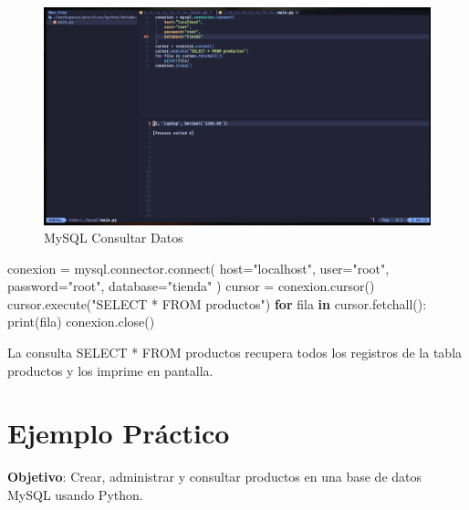 \documentclass[
  a4paper,
  DIV=11,
  numbers=noendperiod,
  onepage,
  openany]{scrreprt}
\newenvironment{Shaded}{\begin{snugshade}}{\end{snugshade}}
\newcommand{\BuiltInTok}[1]{\textcolor[rgb]{0.00,0.23,0.31}{#1}}
\newcommand{\ControlFlowTok}[1]{\textcolor[rgb]{0.00,0.23,0.31}{\textbf{#1}}}
\newcommand{\ExtensionTok}[1]{\textcolor[rgb]{0.00,0.23,0.31}{#1}}
\newcommand{\KeywordTok}[1]{\textcolor[rgb]{0.00,0.23,0.31}{\textbf{#1}}}
\newcommand{\NormalTok}[1]{\textcolor[rgb]{0.00,0.23,0.31}{#1}}
\newcommand{\OperatorTok}[1]{\textcolor[rgb]{0.37,0.37,0.37}{#1}}
\newcommand{\StringTok}[1]{\textcolor[rgb]{0.13,0.47,0.30}{#1}}
\begin{document}
\begin{figure}[H]

{\centering \includegraphics[width=8.33333in,height=\textheight,keepaspectratio]{unidades/unidad6/./images/mysql_code003.png}

}

\caption{MySQL Consultar Datos}

\end{figure}%

\begin{Shaded}
\begin{Highlighting}[]
\NormalTok{conexion }\OperatorTok{=}\NormalTok{ mysql.connector.}\ExtensionTok{connect}\NormalTok{(}
\NormalTok{    host}\OperatorTok{=}\StringTok{"localhost"}\NormalTok{,}
\NormalTok{    user}\OperatorTok{=}\StringTok{"root"}\NormalTok{,}
\NormalTok{    password}\OperatorTok{=}\StringTok{"root"}\NormalTok{,}
\NormalTok{    database}\OperatorTok{=}\StringTok{"tienda"}
\NormalTok{)}
\NormalTok{cursor }\OperatorTok{=}\NormalTok{ conexion.cursor()}
\NormalTok{cursor.execute(}\StringTok{"SELECT * FROM productos"}\NormalTok{)}
\ControlFlowTok{for}\NormalTok{ fila }\KeywordTok{in}\NormalTok{ cursor.fetchall():}
    \BuiltInTok{print}\NormalTok{(fila)}
\NormalTok{conexion.close()}
\end{Highlighting}
\end{Shaded}

La consulta SELECT * FROM productos recupera todos los registros de la
tabla productos y los imprime en pantalla.

\section{Ejemplo Práctico}\label{ejemplo-pruxe1ctico-13}

\textbf{Objetivo}: Crear, administrar y consultar productos en una base
de datos MySQL usando Python.
\end{document}
